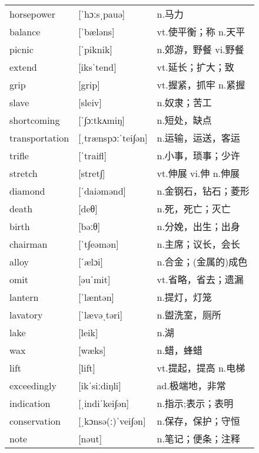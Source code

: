 \documentclass[a4paper]{article}
\begin{document}
\section{}
\begin{tabular}{l l l}

horsepower & [ˈhɔːsˌpauə] & n.马力 \\
balance & [ˈbæləns] & vt.使平衡；称 n.天平 \\
picnic & [ˈpiknik] & n.郊游，野餐 vi.野餐 \\
extend & [iksˈtend] & vt.延长；扩大；致 \\
grip & [grip] & vt.握紧，抓牢 n.紧握 \\
slave & [sleiv] & n.奴隶；苦工 \\
shortcoming & [ˈ∫ɔːtkʌmiŋ] & n.短处，缺点 \\
transportation & [ˌtrænspɔːˈtei∫ən] & n.运输，运送，客运 \\
trifle & [ˈtraifl] & n.小事，琐事；少许 \\
stretch & [stret∫] & vt.伸展 vi.伸 n.伸展 \\
diamond & [ˈdaiəmənd] & n.金钢石，钻石；菱形 \\
death & [deθ] & n.死，死亡；灭亡 \\
birth & [bəːθ] & n.分娩，出生；出身 \\
chairman & [ˈt∫eəmən] & n.主席；议长，会长 \\
alloy & [ˈælɔi] & n.合金；(金属的)成色 \\
omit & [əuˈmit] & vt.省略，省去；遗漏 \\
lantern & [ˈlæntən] & n.提灯，灯笼 \\
lavatory & [ˈlævəˌtəri] & n.盥洗室，厕所 \\
lake & [leik] & n.湖 \\
wax & [wæks] & n.蜡，蜂蜡 \\
lift & [lift] & vt.提起，提高 n.电梯 \\
exceedingly & [ikˈsiːdiŋli] & ad.极端地，非常 \\
indication & [ˌindiˈkei∫ən] & n.指示;表示；表明 \\
conservation & [ˌkɔnsə(ː)ˈvei∫ən] & n.保存，保护；守恒 \\
note & [nəut] & n.笔记；便条；注释 \\

\end{tabular}
\end{document}
